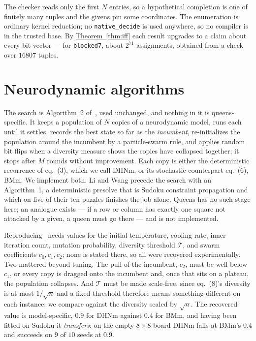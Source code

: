 \documentclass{easychair}
\newcommand{\citeref}[1]{\textcolor{academicpurple}{\cite{#1}}}
\newcommand{\thmref}[1]{\textcolor{academicpurple}{\hyperref[#1]{Theorem~\ref*{#1}}}}
\begin{document}
The checker reads only the first $N$ entries, so a hypothetical completion is one of finitely many
tuples and the givens pin some coordinates. The enumeration is ordinary kernel reduction; no
\lstinline{native_decide} is used anywhere, so no compiler is in the trusted base. By \thmref{thm:iff}
each result upgrades to a claim about every bit vector --- for \texttt{blocked7}, about $2^{71}$
assignments, obtained from a check over $16807$ tuples.

\section{Neurodynamic algorithms}\label{sec:solver}

The search is Algorithm~2 of~\citeref{liwang2022}, used unchanged, and nothing in it is
queens-specific. It keeps a population of $N$ copies of a neurodynamic model, runs each until it
settles, records the best state so far as the \emph{incumbent}, re-initializes the population around
the incumbent by a particle-swarm rule, and applies random bit flips when a diversity measure shows
the copies have collapsed together; it stops after $M$ rounds without improvement. Each copy is either
the deterministic recurrence of eq.~(3), which we call DHNm, or its stochastic counterpart eq.~(6),
BMm. We implement both. Li and Wang precede the search with an Algorithm~1, a deterministic presolve
that is Sudoku constraint propagation and which on five of their ten puzzles finishes the job alone.
Queens has no such stage here; an analogue exists --- if a row or column has exactly one square not
attacked by a given, a queen must go there --- and is not implemented.

Reproducing~\citeref{liwang2022} needs values for the initial temperature, cooling rate, inner
iteration count, mutation probability, diversity threshold $\mathcal{T}$, and swarm coefficients
$c_0,c_1,c_2$; none is stated there, so all were recovered experimentally. Two mattered beyond tuning.
The pull of the incumbent, $c_2$, must be well below $c_1$, or every copy is dragged onto the
incumbent and, once that sits on a plateau, the population collapses. And $\mathcal{T}$ must be made
scale-free, since eq.~(8)'s diversity is at most $1/\sqrt{n}$ and a fixed threshold therefore means
something different on each instance; we compare against the diversity scaled by $\sqrt{n}$. The
recovered value is model-specific, $0.9$ for DHNm against $0.4$ for BMm, and having been fitted on
Sudoku it \emph{transfers}: on the empty $8\times8$ board DHNm fails at BMm's $0.4$ and succeeds on
$9$ of $10$ seeds at $0.9$.
\end{document}
